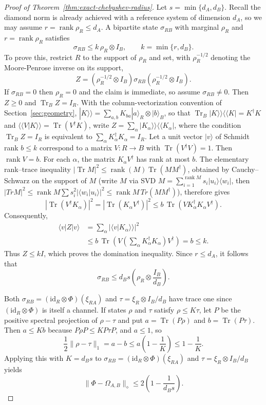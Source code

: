 \documentclass[11pt,a4paper]{article}
\theoremstyle{definition}
\theoremstyle{plain}
\theoremstyle{remark}
\DeclareMathOperator{\Tr}{Tr}
\newcommand{\id}{\mathrm{id}}
\begin{document}
\begin{proof}[Proof of Theorem~\ref{thm:exact-chebyshev-radius}]
Let $s=\min\{d_A,d_B\}$. Recall the diamond norm is already achieved with a reference system of dimension $d_A$, so we may assume $r=\operatorname{rank}\rho_R\le d_A$. A bipartite state $\sigma_{RB}$ with marginal
$\rho_R$ and $r=\operatorname{rank}\rho_R$ satisfies
\[
\sigma_{RB}\leq k\,\rho_R\otimes I_B,
\qquad
k=\min\{r,d_B\}.
\]
To prove this, restrict $R$ to the support of $\rho_R$ and set, with $\rho_R^{-1/2}$ denoting the Moore-Penrose inverse on its support,
\[
Z=(\rho_R^{-1/2}\otimes I_B)\sigma_{RB}
  (\rho_R^{-1/2}\otimes I_B).
\]
If $\sigma_{RB}=0$ then $\rho_R=0$ and the claim is immediate, so assume $\sigma_{RB}\neq0$. Then $Z\geq0$ and $\Tr_BZ=I_R$. With the column-vectorization convention of Section~\ref{sec:geometry},
$|K\rangle\rangle=\sum_{a,b}K_{ba}|a\rangle_R\otimes|b\rangle_B$, so that
$\Tr_B|K\rangle\rangle\langle\langle K|=K^\dagger K$ and
$\langle\langle V|K\rangle\rangle=\Tr(V^\dagger K)$, write
$Z=\sum_\alpha|K_\alpha\rangle\rangle
\langle\langle K_\alpha|$, where the condition $\Tr_BZ=I_R$ is equivalent to $\sum_\alpha K_\alpha^\dagger K_\alpha=I_R$. Let a unit vector
$|v\rangle$ of Schmidt rank $b\leq k$ correspond to a matrix
$V:R\to B$ with $\Tr(V^\dagger V)=1$. Then
$\operatorname{rank}V=b$. For each $\alpha$, the
matrix $K_\alpha V^\dagger$ has rank at most $b$. The elementary
rank--trace inequality
$|\Tr M|^2\leq\operatorname{rank}(M)\Tr(MM^\dagger)$, obtained by
Cauchy--Schwarz on the support of $M$ (write $M$ via SVD $M=\sum_{i=1}^{\operatorname{rank}M}s_i|u_i\rangle\langle w_i|$, then $|Tr M|^2\le \operatorname{rank}M\sum s_i^2|\langle w_i|u_i\rangle|^2\le \operatorname{rank}M\,Tr(MM^\dagger)$), therefore gives
\[
|\Tr(V^\dagger K_\alpha)|^2
=|\Tr(K_\alpha V^\dagger)|^2
\leq b\,\Tr(VK_\alpha^\dagger K_\alpha V^\dagger).
\]
Consequently,
\begin{align*}
\langle v|Z|v\rangle
&=\sum_\alpha|\langle v|K_\alpha\rangle\rangle|^2\\
&\leq b\,\Tr\left(
V\left(\sum_\alpha K_\alpha^\dagger K_\alpha\right)V^\dagger
\right)
=b\leq k.
\end{align*}
Thus $Z\leq kI$, which proves the domination inequality. Since
$r\leq d_A$, it follows that
\[
\sigma_{RB}
\leq d_Bs\left(\rho_R\otimes\frac{I_B}{d_B}\right).
\]

Both $\sigma_{RB}=(\id_R\otimes\Phi)(\xi_{RA})$ and $\tau=\xi_R\otimes I_B/d_B$ have trace one since $(\id_R\otimes\Phi)$ is itself a channel. If states $\rho$ and $\tau$ satisfy $\rho\leq K\tau$, let $P$ be the
positive spectral projection of $\rho-\tau$ and put
$a=\Tr(P\rho)$ and $b=\Tr(P\tau)$. Then $a\leq Kb$ because $P\rho P\le K P\tau P$, and $a\leq1$, so
\[
\frac12\|\rho-\tau\|_1=a-b
\leq a\left(1-\frac1K\right)
\leq1-\frac1K.
\]
Applying this with $K=d_Bs$ to
$\sigma_{RB}=(\id_R\otimes\Phi)(\xi_{RA})$ and
$\tau=\xi_R\otimes I_B/d_B$ yields
\[
\|\Phi-\Omega_{A,B}\|_\diamond
\leq2\left(1-\frac1{d_Bs}\right).
\]


\end{proof}
\end{document}
